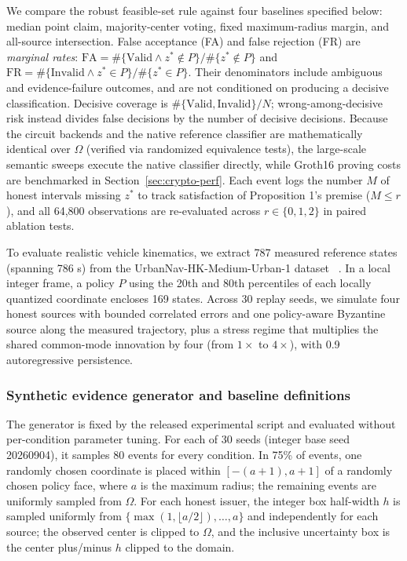 \documentclass[pdflatex,iicol,sn-mathphys-num]{sn-jnl}
\theoremstyle{thmstyleone}
\begin{document}
We compare the robust feasible-set rule against four baselines specified below: median point claim, majority-center voting, fixed maximum-radius margin, and all-source intersection. False acceptance (FA) and false rejection (FR) are \emph{marginal rates}: $\mathrm{FA}=\#\{\mathrm{Valid}\wedge z^*\notin P\}/\#\{z^*\notin P\}$ and $\mathrm{FR}=\#\{\mathrm{Invalid}\wedge z^*\in P\}/\#\{z^*\in P\}$. Their denominators include ambiguous and evidence-failure outcomes, and are not conditioned on producing a decisive classification. Decisive coverage is $\#\{\mathrm{Valid},\mathrm{Invalid}\}/N$; wrong-among-decisive risk instead divides false decisions by the number of decisive decisions. Because the circuit backends and the native reference classifier are mathematically identical over $\Omega$ (verified via randomized equivalence tests), the large-scale semantic sweeps execute the native classifier directly, while Groth16 proving costs are benchmarked in Section~\ref{sec:crypto-perf}. Each event logs the number $M$ of honest intervals missing $z^*$ to track satisfaction of Proposition 1's premise ($M \le r$), and all 64,800 observations are re-evaluated across $r \in \{0, 1, 2\}$ in paired ablation tests.

To evaluate realistic vehicle kinematics, we extract 787 measured reference states (spanning 786 s) from the UrbanNav-HK-Medium-Urban-1 dataset ~\citep{UrbanNav}. In a local integer frame, a policy $P$ using the 20th and 80th percentiles of each locally quantized coordinate encloses 169 states. Across 30 replay seeds, we simulate four honest sources with bounded correlated errors and one policy-aware Byzantine source along the measured trajectory, plus a stress regime that multiplies the shared common-mode innovation by four (from $1\times$ to $4\times$), with 0.9 autoregressive persistence.


\subsubsection{Synthetic evidence generator and baseline definitions}
The generator is fixed by the released experimental script and evaluated without per-condition parameter tuning. For each of 30 seeds (integer base seed 20260904), it samples 80 events for every condition. In 75\% of events, one randomly chosen coordinate is placed within $[-(a+1),a+1]$ of a randomly chosen policy face, where $a$ is the maximum radius; the remaining events are uniformly sampled from $\Omega$. For each honest issuer, the integer box half-width $h$ is sampled uniformly from $\{\max(1,\lfloor a/2\rfloor),\ldots,a\}$ and independently for each source; the observed center is clipped to $\Omega$, and the inclusive uncertainty box is the center plus/minus $h$ clipped to the domain.
\end{document}
